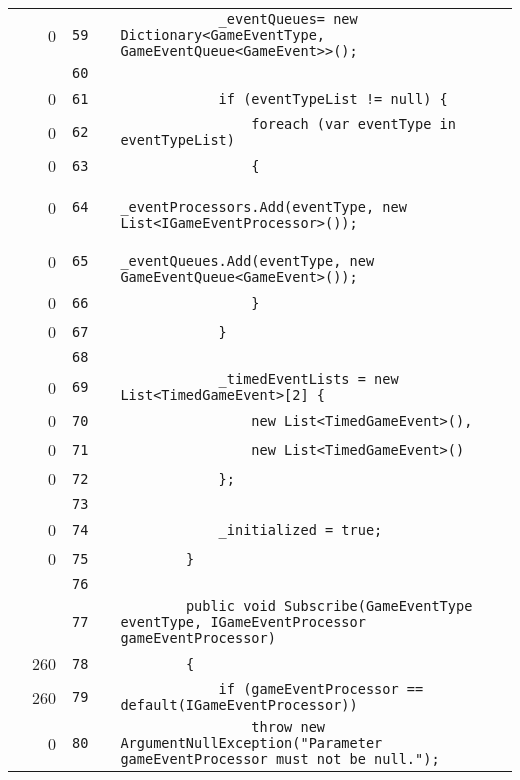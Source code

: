 \documentclass[a4paper,landscape,10pt]{article}
\begin{document}
\begin{longtable}[l]{lrrll}
\cellcolor{red} & 0 & \verb~59~ & & \verb~            _eventQueues= new Dictionary<GameEventType, GameEventQueue<GameEvent>>();~\\
\cellcolor{gray} &  & \verb~60~ & & \verb~~\\
\cellcolor{red} & 0 & \verb~61~ & & \verb~            if (eventTypeList != null) {~\\
\cellcolor{red} & 0 & \verb~62~ & & \verb~                foreach (var eventType in eventTypeList)~\\
\cellcolor{red} & 0 & \verb~63~ & & \verb~                {~\\
\cellcolor{red} & 0 & \verb~64~ & & \verb~                    _eventProcessors.Add(eventType, new List<IGameEventProcessor>());~\\
\cellcolor{red} & 0 & \verb~65~ & & \verb~                    _eventQueues.Add(eventType, new GameEventQueue<GameEvent>());~\\
\cellcolor{red} & 0 & \verb~66~ & & \verb~                }~\\
\cellcolor{red} & 0 & \verb~67~ & & \verb~            }~\\
\cellcolor{gray} &  & \verb~68~ & & \verb~~\\
\cellcolor{red} & 0 & \verb~69~ & & \verb~            _timedEventLists = new List<TimedGameEvent>[2] {~\\
\cellcolor{red} & 0 & \verb~70~ & & \verb~                new List<TimedGameEvent>(),~\\
\cellcolor{red} & 0 & \verb~71~ & & \verb~                new List<TimedGameEvent>()~\\
\cellcolor{red} & 0 & \verb~72~ & & \verb~            };~\\
\cellcolor{gray} &  & \verb~73~ & & \verb~~\\
\cellcolor{red} & 0 & \verb~74~ & & \verb~            _initialized = true;~\\
\cellcolor{red} & 0 & \verb~75~ & & \verb~        }~\\
\cellcolor{gray} &  & \verb~76~ & & \verb~~\\
\cellcolor{gray} &  & \verb~77~ & & \verb~        public void Subscribe(GameEventType eventType, IGameEventProcessor gameEventProcessor)~\\
\cellcolor{green} & 260 & \verb~78~ & & \verb~        {~\\
\cellcolor{orange} & 260 & \verb~79~ & & \verb~            if (gameEventProcessor == default(IGameEventProcessor))~\\
\cellcolor{red} & 0 & \verb~80~ & & \verb~                throw new ArgumentNullException("Parameter gameEventProcessor must not be null.");~\\

\end{longtable}
\end{document}

